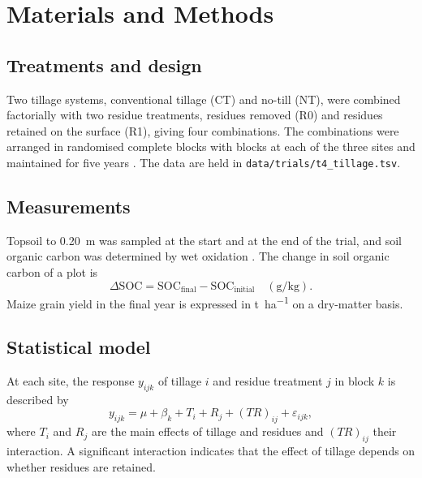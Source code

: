 \section{Materials and Methods}

\subsection{Treatments and design}
Two tillage systems, conventional tillage (CT) and no-till (NT), were combined
factorially with two residue treatments, residues removed (R0) and residues
retained on the surface (R1), giving four combinations. The combinations were
arranged in randomised complete blocks with  blocks at each of the three
sites and maintained for five years \parencite{gomez1984}. The data are held in
\texttt{data/trials/t4\_tillage.tsv}.

\subsection{Measurements}
Topsoil to \SI{0.20}{\metre} was sampled at the start and at the end of the
trial, and soil organic carbon was determined by wet oxidation
\parencite{walkley1934}. The change in soil organic carbon of a plot is
\begin{equation}
  \Delta\mathrm{SOC} = \mathrm{SOC}_{\mathrm{final}} - \mathrm{SOC}_{\mathrm{initial}}
  \quad (\si{\gram\per\kilo\gram}).
  \label{eq:dsoc}
\end{equation}
Maize grain yield in the final year is expressed in \si{\tonne\per\hectare} on a
dry-matter basis.

\subsection{Statistical model}
At each site, the response $y_{ijk}$ of tillage $i$ and residue treatment $j$ in
block $k$ is described by
\begin{equation}
  y_{ijk} = \mu + \beta_k + T_i + R_j + (TR)_{ij} + \varepsilon_{ijk},
  \label{eq:factorial}
\end{equation}
where $T_i$ and $R_j$ are the main effects of tillage and residues and
$(TR)_{ij}$ their interaction. A significant interaction indicates that the
effect of tillage depends on whether residues are retained.
